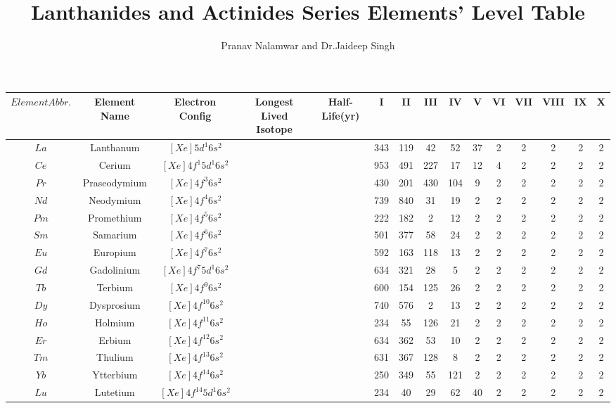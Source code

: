 \documentclass[2pt]{article}
\begin{document}
\raggedright
\title{Lanthanides and Actinides Series Elements' Level Table}
\author{Pranav Nalamwar and Dr.Jaideep Singh}
\maketitle

\begin{tabular}{|c|c|c|c|c|c|c|c|c|c|c|c|c|c|c|}
\hline
$Element Abbr.$ & Element Name & Electron Config & Longest Lived Isotope & Half-Life(yr) & I & II & III & IV & V & VI & VII & VIII & IX & X\\ \hline 
$La$ & Lanthanum & $[Xe] 5d^1 6s^2$ & & & 343 & 119 & 42 & 52 & 37 & 2 & 2 & 2 & 2 & 2\\ \hline
$Ce$ & Cerium & $[Xe]4f^1 5d^1 6s^2$ & & & 953 & 491 & 227 & 17 & 12 & 4 & 2 & 2 & 2 & 2\\ \hline
$Pr$ & Praseodymium & $[Xe] 4f^3 6s^2$ & & & 430 & 201 & 430 & 104 & 9 & 2 & 2 & 2 & 2 & 2\\ \hline
$Nd$ & Neodymium & $[Xe] 4f^4 6s^2$ & & & 739 & 840 & 31 & 19 & 2 & 2 & 2 & 2 & 2 & 2\\ \hline
$Pm$ & Promethium & $[Xe] 4f^5 6s^2$ & & &  222 & 182 & 2 & 12 & 2 & 2 & 2 & 2 & 2 & 2\\ \hline
$Sm$ & Samarium & $[Xe] 4f^6 6s^2$ & & & 501 & 377 & 58 & 24 & 2 & 2 & 2 & 2 & 2 & 2\\ \hline
$Eu$ & Europium & $[Xe] 4f^7 6s^2$ & & & 592 & 163 & 118 & 13 & 2 & 2 & 2 & 2 & 2 & 2\\ \hline
$Gd$ & Gadolinium & $[Xe] 4f^7 5d^1 6s^2$ & & & 634 & 321 & 28 & 5 & 2 & 2 & 2 & 2 & 2 & 2\\ \hline
$Tb$ & Terbium & $[Xe] 4f^9 6s^2$ & & & 600 & 154 & 125 & 26 & 2 & 2 & 2 & 2 & 2 & 2\\ \hline
$Dy$ & Dysprosium & $ [Xe] 4f^10 6s^2$ & & & 740 & 576 & 2 & 13 & 2 & 2 & 2 & 2 & 2 & 2\\ \hline
$Ho$ & Holmium & $ [Xe] 4f^11 6s^2$ & & & 234 & 55  & 126 & 21 & 2 & 2 & 2 & 2 & 2 & 2\\ \hline
$Er$ & Erbium & $[Xe] 4f^12 6s^2$ & & & 634 & 362 & 53 & 10 & 2 & 2 & 2 & 2 & 2 & 2\\ \hline
$Tm$ & Thulium & $[Xe] 4f^13 6s^2$ & & & 631 & 367 & 128 & 8 & 2 & 2 & 2 & 2 & 2 & 2\\ \hline
$Yb$ & Ytterbium & $[Xe] 4f^14 6s^2$ & & & 250 & 349 & 55 & 121 & 2 & 2 & 2 & 2 & 2 & 2\\ \hline
$Lu$ & Lutetium & $ [Xe] 4f^14 5d^1 6s^2$ & & & 234 & 40 & 29 & 62 & 40 & 2 & 2 & 2 & 2 & 2 \\ \hline

\end{tabular}
\end{document}
